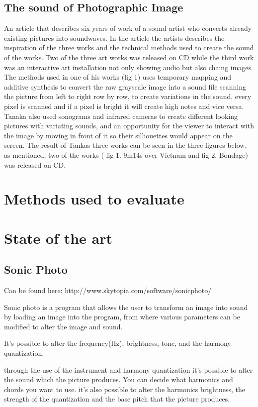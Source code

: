 \subsection{The sound of Photographic Image}\label{sec:soundarticle}
An article that describes six years of work of a sound artist who converts already existing pictures into soundwaves. In the article the artists describes the inspiration of the three works and the technical methods used to create the sound of the works. Two of the three art works was released on CD while the third work was an interactive art installation not only showing audio but also chaing images. The methods used in one of his works (fig 1) uses temporary mapping and additive synthesis to convert the raw grayscale image into a sound file scanning the picture from left to right row by row, to create variations in the sound, every pixel is scanned and if a pixel is bright it will create high notes and vice versa.  Tanaka also used sonograms and infrared cameras to create different looking pictures with variating sounds, and an opportunity for the viewer to interact with the image by moving in front of it so their silhouettes would appear on the screen. The result of Tankas three works can be seen in the three figures below, as mentioned, two of the works ( fig 1. 9m14s over Vietnam and fig 2. Bondage) was released on CD.


\section{Methods used to evaluate}\label{sub:methodsusedtoevaluate}






\section{State of the art}\label{sec:stateart}

\subsection{Sonic Photo}\label{sub:sonic}
Can be found here: http://www.skytopia.com/software/sonicphoto/

Sonic photo is a program that allows the user to transform an image into sound by loading an image into the program, from where various parameters can be modified to alter the image and sound. 

It's possible to alter the frequency(Hz), brightness, tone, and the harmony quantization. 

through the use of the instrument and harmony quantization it's possible to alter the sound which the picture produces. 
You can decide what harmonics and chords you want to use. 
it's also possible to alter the harmonics brightness, the strength of the quantization and the base pitch that the picture produces. 